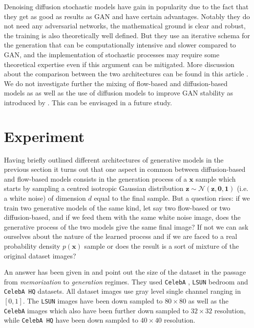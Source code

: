 \documentclass[11pt]{amsart}
\begin{document}
Denoising diffusion stochastic models have gain in popularity due to the fact that they get as good as results as GAN and have certain advantages. Notably they do not need any adversarial networks, the mathematical ground is clear and robust, the training is also theoretically well defined. But they use an iterative schema for the generation that can be computationally intensive and slower compared to GAN, and the implementation of stochastic processes may require some theoretical expertise even if this argument can be mitigated. More discussion about the comparison between the two architectures  can be found in this article \cite{dhariwal2021diffusion}. We do not investigate further the mixing of flow-based and diffusion-based models as \citep[e.g.][]{zhang2021diffusion,gong2021interpreting} as well as the use of diffusion models to improve GAN stability as introduced by \cite{Wang2022}. This can be envisaged in a future study.
%
\section{Experiment}
%
Having briefly outlined different architectures of generative models in the previous section it turns out that one aspect in common between diffusion-based and flow-based models consists in the generation process of a $\bm{x}$ sample which starts by sampling a centred isotropic Gaussian distribution $\bm{z}\sim \mathcal{N}(\bm{z},\bm{0},\bm{1})$ (i.e. a white noise) of dimension $d$ equal to the final sample. But a question rises: if we train two generative models of the same kind, let say two flow-based or two diffusion-based, and if we feed them with the same white noise image, does the generative process of the two models give the same final image? If not we can ask ourselves about the nature of the learned process and if we are faced to a real probability density $p(\bm{x})$ sample or does the result is a sort of mixture of the original dataset images? 

An answer has been given in \cite{kadkhodaie2024generalization} and point out the size of the dataset in the passage from \textit{memorization} to \textit{generation} regimes. They used \texttt{CelebA} \citep{Liu2015}, \texttt{LSUN} bedroom \citep{Yu2015} and  \texttt{CelebA HQ} \citep{KarrasALL18} datasets. All dataset images use  gray level single channel ranging in $[0,1]$.  The \texttt{LSUN}  images have been down sampled to $80\times 80$ as well as the \texttt{CelebA} images which also have been further down sampled to $32\times 32$ resolution, while \texttt{CelebA HQ}  have been down sampled to $40\times 40$ resolution. 
\end{document}
